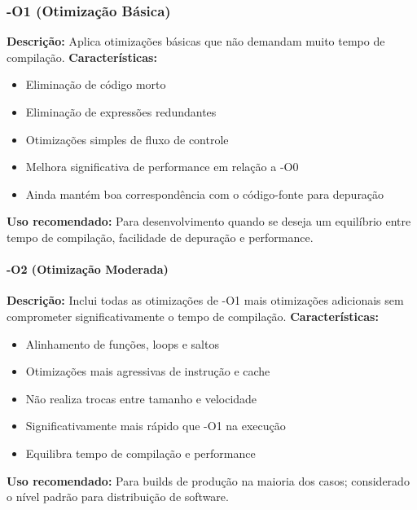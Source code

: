 \documentclass[12pt,a4paper]{article}
\begin{document}
\subsubsection*{-O1 (Otimização Básica)}
\textbf{Descrição:} Aplica otimizações básicas que não demandam muito tempo de compilação.
\textbf{Características:}
\begin{itemize}
    \item Eliminação de código morto
    \item Eliminação de expressões redundantes
    \item Otimizações simples de fluxo de controle
    \item Melhora significativa de performance em relação a -O0
    \item Ainda mantém boa correspondência com o código-fonte para depuração
\end{itemize}
\textbf{Uso recomendado:} Para desenvolvimento quando se deseja um equilíbrio entre tempo de compilação, facilidade de depuração e performance.

\paragraph{-O2 (Otimização Moderada)}
\textbf{Descrição:} Inclui todas as otimizações de -O1 mais otimizações adicionais sem comprometer significativamente o tempo de compilação.
\textbf{Características:}
\begin{itemize}
    \item Alinhamento de funções, loops e saltos
    \item Otimizações mais agressivas de instrução e cache
    \item Não realiza trocas entre tamanho e velocidade
    \item Significativamente mais rápido que -O1 na execução
    \item Equilibra tempo de compilação e performance
\end{itemize}
\textbf{Uso recomendado:} Para builds de produção na maioria dos casos; considerado o nível padrão para distribuição de software.
\end{document}
